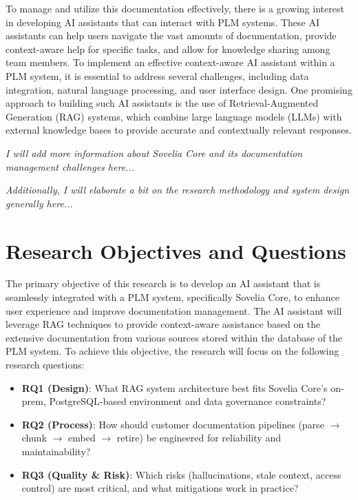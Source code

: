 To manage and utilize this documentation effectively, there is a growing interest in developing AI assistants that can interact with PLM systems. These AI assistants can help users navigate the vast amounts of documentation, provide context-aware help for specific tasks, and allow for knowledge sharing among team members. To implement an effective context-aware AI assistant within a PLM system, it is essential to address several challenges, including data integration, natural language processing, and user interface design. One promising approach to building such AI assistants is the use of Retrieval-Augmented Generation (RAG) systems, which combine large language models (LLMs) with external knowledge bases to provide accurate and contextually relevant responses\parencite{lewis_retrieval-augmented_2021}.


\textit{I will add more information about Sovelia Core and its documentation management challenges here...}

\textit{Additionally, I will elaborate a bit on the research methodology and system design generally here...}

\section{Research Objectives and Questions}
\label{sec:research-objectives-and-questions}

The primary objective of this research is to develop an AI assistant that is seamlessly integrated with a PLM system, specifically Sovelia Core, to enhance user experience and improve documentation management. The AI assistant will leverage RAG techniques to provide context-aware assistance based on the extensive documentation from various sources stored within the database of the PLM system. To achieve this objective, the research will focus on the following research questions:

\begin{itemize}
	\item \textbf{RQ1 (Design)}: What RAG system architecture best fits Sovelia Core's on-prem, PostgreSQL-based environment and data governance constraints?
	\item \textbf{RQ2 (Process)}: How should customer documentation pipelines (parse $ \rightarrow $ chunk $ \rightarrow $ embed $ \rightarrow $ retire) be engineered for reliability and maintainability?
	\item \textbf{RQ3 (Quality \& Risk)}: Which risks (hallucinations, stale context, access control) are most critical, and what mitigations work in practice?
\end{itemize}

